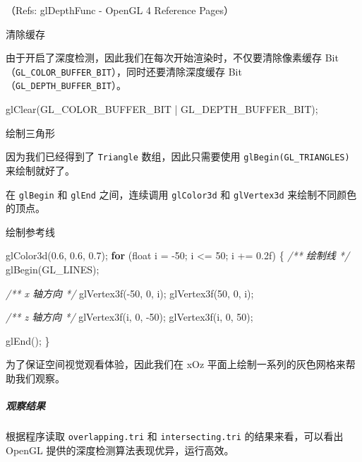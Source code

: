 \documentclass[
]{article}
\newenvironment{Shaded}{}{}
\newcommand{\BuiltInTok}[1]{#1}
\newcommand{\CommentTok}[1]{\textcolor[rgb]{0.38,0.63,0.69}{\textit{#1}}}
\newcommand{\ControlFlowTok}[1]{\textcolor[rgb]{0.00,0.44,0.13}{\textbf{#1}}}
\newcommand{\DataTypeTok}[1]{\textcolor[rgb]{0.56,0.13,0.00}{#1}}
\newcommand{\DecValTok}[1]{\textcolor[rgb]{0.25,0.63,0.44}{#1}}
\newcommand{\FloatTok}[1]{\textcolor[rgb]{0.25,0.63,0.44}{#1}}
\newcommand{\NormalTok}[1]{#1}
\begin{document}
（Refs: glDepthFunc - OpenGL 4 Reference Pages）

清除缓存

由于开启了深度检测，因此我们在每次开始渲染时，不仅要清除像素缓存
Bit（\texttt{GL\_COLOR\_BUFFER\_BIT}），同时还要清除深度缓存
Bit（\texttt{GL\_DEPTH\_BUFFER\_BIT}）。

\begin{Shaded}
\begin{Highlighting}[]
\NormalTok{glClear(GL_COLOR_BUFFER_BIT | GL_DEPTH_BUFFER_BIT);}
\end{Highlighting}
\end{Shaded}

绘制三角形

因为我们已经得到了 \texttt{Triangle} 数组，因此只需要使用
\texttt{glBegin(GL\_TRIANGLES)} 来绘制就好了。

在 \texttt{glBegin} 和 \texttt{glEnd} 之间，连续调用 \texttt{glColor3d}
和 \texttt{glVertex3d} 来绘制不同颜色的顶点。

绘制参考线

\begin{Shaded}
\begin{Highlighting}[]
\NormalTok{glColor3d(}\FloatTok{0.6}\NormalTok{, }\FloatTok{0.6}\NormalTok{, }\FloatTok{0.7}\NormalTok{);}
\ControlFlowTok{for}\NormalTok{ (}\DataTypeTok{float}\NormalTok{ i = -}\DecValTok{50}\NormalTok{; i <= }\DecValTok{50}\NormalTok{; i += }\FloatTok{0.2}\BuiltInTok{f}\NormalTok{)}
\NormalTok{\{}
	\CommentTok{/** 绘制线 */}
\NormalTok{	glBegin(GL_LINES);}

	\CommentTok{/** x 轴方向 */}
\NormalTok{	glVertex3f(-}\DecValTok{50}\NormalTok{, }\DecValTok{0}\NormalTok{, i);}
\NormalTok{	glVertex3f(}\DecValTok{50}\NormalTok{, }\DecValTok{0}\NormalTok{, i);}

	\CommentTok{/** z 轴方向 */}
\NormalTok{	glVertex3f(i, }\DecValTok{0}\NormalTok{, -}\DecValTok{50}\NormalTok{);}
\NormalTok{	glVertex3f(i, }\DecValTok{0}\NormalTok{, }\DecValTok{50}\NormalTok{);}

\NormalTok{	glEnd();}
\NormalTok{\}}
\end{Highlighting}
\end{Shaded}

为了保证空间视觉观看体验，因此我们在 xOz
平面上绘制一系列的灰色网格来帮助我们观察。

\hypertarget{header-n78}{%
\subparagraph{观察结果}\label{header-n78}}

根据程序读取 \texttt{overlapping.tri} 和 \texttt{intersecting.tri}
的结果来看，可以看出 OpenGL 提供的深度检测算法表现优异，运行高效。
\end{document}
